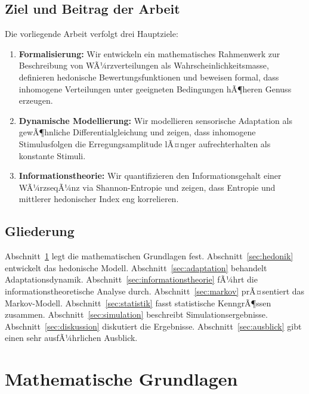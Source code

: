 ﻿\documentclass[12pt,a4paper]{article}
\theoremstyle{definition}
\begin{document}
\subsection{Ziel und Beitrag der Arbeit}

Die vorliegende Arbeit verfolgt drei Hauptziele:
\begin{enumerate}[label=(\roman*)]
  \item \textbf{Formalisierung:} Wir entwickeln ein mathematisches
  Rahmenwerk zur Beschreibung von WÃ¼rzverteilungen als
  Wahrscheinlichkeitsmasse, definieren hedonische Bewertungsfunktionen
  und beweisen formal, dass inhomogene Verteilungen unter geeigneten
  Bedingungen hÃ¶heren Genuss erzeugen.

  \item \textbf{Dynamische Modellierung:} Wir modellieren sensorische
  Adaptation als gewÃ¶hnliche Differentialgleichung und zeigen, dass
  inhomogene Stimulusfolgen die Erregungsamplitude lÃ¤nger aufrechterhalten
  als konstante Stimuli.

  \item \textbf{Informationstheorie:} Wir quantifizieren den
  Informationsgehalt einer WÃ¼rzseqÃ¼nz via Shannon-Entropie und zeigen,
  dass Entropie und mittlerer hedonischer Index eng korrelieren.
\end{enumerate}

\subsection{Gliederung}

Abschnitt~\ref{sec:grundlagen} legt die mathematischen Grundlagen fest.
Abschnitt~\ref{sec:hedonik} entwickelt das hedonische Modell.
Abschnitt~\ref{sec:adaptation} behandelt Adaptationsdynamik.
Abschnitt~\ref{sec:informationstheorie} fÃ¼hrt die informationstheoretische
Analyse durch. Abschnitt~\ref{sec:markov} prÃ¤sentiert das Markov-Modell.
Abschnitt~\ref{sec:statistik} fasst statistische KenngrÃ¶ssen zusammen.
Abschnitt~\ref{sec:simulation} beschreibt Simulationsergebnisse.
Abschnitt~\ref{sec:diskussion} diskutiert die Ergebnisse.
Abschnitt~\ref{sec:ausblick} gibt einen sehr ausfÃ¼hrlichen Ausblick.

\section{Mathematische Grundlagen}\label{sec:grundlagen}
\end{document}
